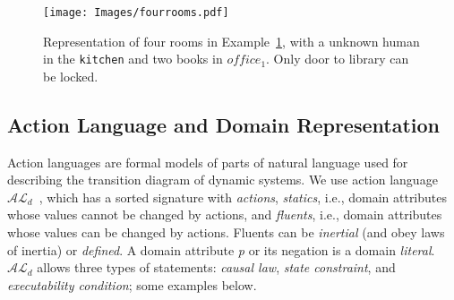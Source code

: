 \documentclass[letterpaper, 10 pt, conference]{ieeeconf}  %
\newcommand{\stt}[1]{{\small\texttt{#1}}}
\begin{document}
\begin{figure}[tbh]
  \centering
  \texttt{[image: Images/fourrooms.pdf]}
  \caption{Representation of four rooms in Example~\ref{fig:places},
    with a unknown human in the \stt{kitchen} and two books in
    $office_1$.  Only door to library can be locked.}
  \label{fig:places}
\end{figure}



\subsection{Action Language and Domain Representation}
\label{sec:arch-ald}
Action languages are formal models of parts of natural language used
for describing the transition diagram of dynamic systems. We use
action language $\mathcal{AL}_d$~\cite{gelfond:ANCL13}, which has a
sorted signature with \emph{actions}, \emph{statics}, i.e., domain
attributes whose values cannot be changed by actions, and
\emph{fluents}, i.e., domain attributes whose values can be changed by
actions. Fluents can be \emph{inertial} (and obey laws of inertia) or
\emph{defined}.  A domain attribute \emph{p} or its negation is a
domain \emph{literal}.  $\mathcal{AL}_d$ allows three types of
statements: \emph{causal law}, \emph{state constraint}, and
\emph{executability condition}; some examples below.
\end{document}
